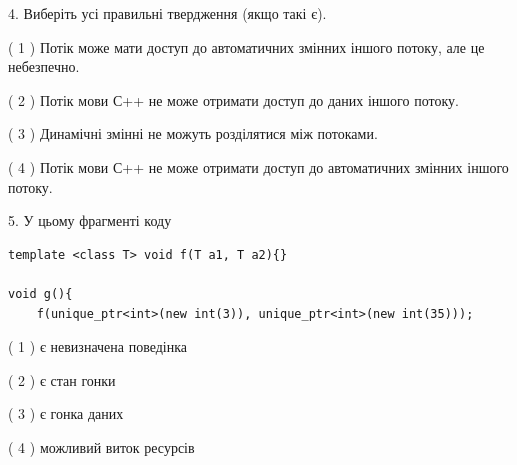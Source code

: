 \documentclass[12pt, ukrainian]{article}
\begin{document}
\begin {large}
{%
4. Виберіть усі правильні твердження (якщо такі є).\par
\vspace{2mm}

( 1 ) Потік може мати доступ до автоматичних змінних іншого потоку, але це небезпечно.%

( 2 ) Потік мови С++ не може отримати доступ до даних іншого потоку.%

( 3 ) Динамічні змінні не можуть розділятися між потоками.%

( 4 ) Потік мови С++ не може отримати доступ до автоматичних змінних іншого потоку.%


5. У цьому фрагменті коду
\begin{verbatim}
template <class T> void f(T a1, T a2){}

void g(){
    f(unique_ptr<int>(new int(3)), unique_ptr<int>(new int(35)));
\end{verbatim}

( 1 ) є невизначена поведінка%

( 2 ) є стан гонки%

( 3 ) є гонка даних%

( 4 ) можливий виток ресурсів%
}
\end {large}
\end{document}
